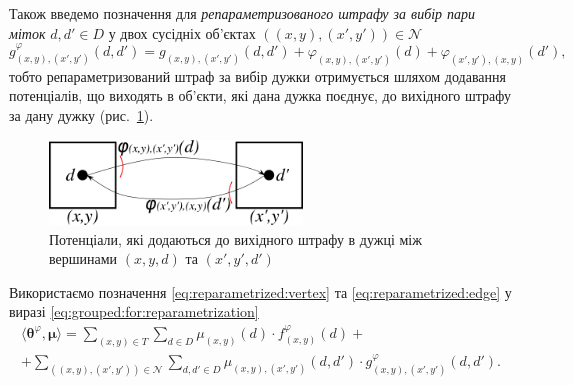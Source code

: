 Також введемо позначення для
\textit{репараметризованого штрафу за вибір пари міток}
$d, d' \in D$ у двох сусідніх об'єктах
$\left( \left(x, y \right), \left(x', y'\right) \right) \in \mathcal{N}$
\begin{equation} \label{eq:reparametrized:edge}
    g_{\left(x, y \right), \left(x', y'\right)}^{\varphi} \left(d, d' \right) =
    g_{\left(x, y \right), \left(x', y' \right)} \left(d, d' \right) +
    \varphi_{\left(x, y \right), \left(x', y' \right)} \left( d \right) +
    \varphi_{\left(x', y' \right), \left(x, y \right)} \left( d' \right),
\end{equation}
тобто репараметризований
штраф за вибір дужки отримується шляхом додавання потенціалів,
що виходять в об'єкти, які дана дужка поєднує, до вихідного штрафу за дану дужку
(рис.~\ref{fig:reparametrized:edge:weight}).

\begin{figure}[h]
  \centering
  \includegraphics[width=0.6\textwidth]{images/reparametrized_edge_weight}
  \caption{Потенціали, які додаються до вихідного штрафу в дужці між вершинами
           $\left(x, y, d \right)$ та $\left(x', y', d' \right)$}
  \label{fig:reparametrized:edge:weight}
\end{figure}

Використаємо позначення \eqref{eq:reparametrized:vertex} та
\eqref{eq:reparametrized:edge}
у виразі \eqref{eq:grouped:for:reparametrization}
\begin{equation*}
\begin{gathered}
    \langle \pmb{\theta}^{\varphi}, \pmb{\mu} \rangle =
    \sum \limits_{\left(x, y \right) \in T}
        \sum \limits_{d \in D}
            \mu_{\left(x, y \right)} \left(d \right) \cdot
            f_{\left(x, y \right)}^{\varphi} \left(d \right) + \\
    + \sum \limits_{\left(\left(x, y \right), \left(x', y' \right)\right)\in \mathcal{N}}
        \sum \limits_{d, d' \in D}
            \mu_{\left(x, y \right), \left(x', y' \right)} \left(d, d' \right)
            \cdot g_{\left(x, y \right), \left(x', y'\right)}^{\varphi} \left(
                d, d'
            \right).
\end{gathered}
\end{equation*}

